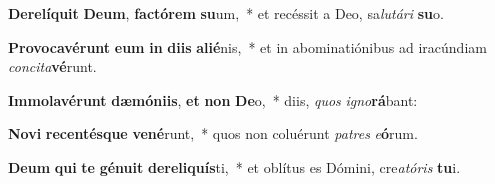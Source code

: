\item \textbf{De}\textbf{re}\textbf{lí}\textbf{quit} \textbf{De}\textbf{um}, \textbf{fac}\textbf{tó}\textbf{rem} \textbf{su}um,~* et recéssit a Deo, sa\textit{lu}\textit{tá}\textit{ri} \textbf{su}o.
\item \textbf{Pro}\textbf{vo}\textbf{ca}\textbf{vé}\textbf{runt} \textbf{e}\textbf{um} \textbf{in} \textbf{di}\textbf{is} \textbf{a}\textbf{li}\textbf{é}nis,~* et in abominatiónibus ad iracúndiam \textit{con}\textit{ci}\textit{ta}\textbf{vé}runt.
\item \textbf{Im}\textbf{mo}\textbf{la}\textbf{vé}\textbf{runt} \textbf{dæ}\textbf{mó}\textbf{ni}\textbf{is}, \textbf{et} \textbf{non} \textbf{De}o,~* diis, \textit{quos} \textit{i}\textit{gno}\textbf{rá}bant:
\item \textbf{No}\textbf{vi} \textbf{re}\textbf{cen}\textbf{tés}\textbf{que} \textbf{ve}\textbf{né}runt,~* quos non coluérunt \textit{pa}\textit{tres} \textit{e}\textbf{ó}rum.
\item \textbf{De}\textbf{um} \textbf{qui} \textbf{te} \textbf{gé}\textbf{nu}\textbf{it} \textbf{de}\textbf{re}\textbf{li}\textbf{quís}ti,~* et oblítus es Dómini, cre\textit{a}\textit{tó}\textit{ris} \textbf{tu}i.
